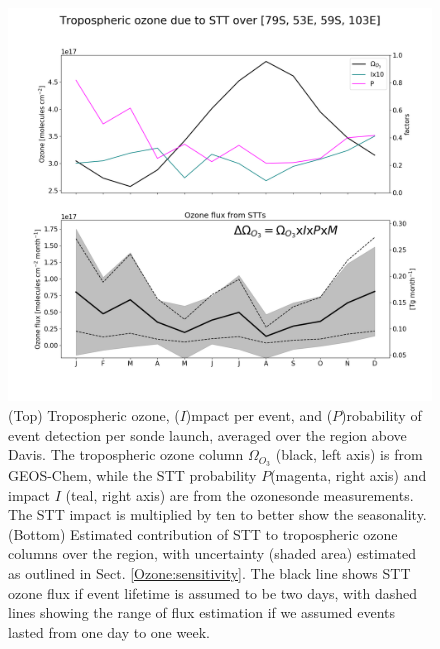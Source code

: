     
    \begin{figure}
      \includegraphics[width=12.0cm]{Figures/Ozone/STT_extrapolation_Dav.png}
      \caption{%
        (Top) Tropospheric ozone, ($I$)mpact per event, and ($P$)robability of event detection per sonde launch, averaged over the region above Davis.
        The tropospheric ozone column $\Omega_{O_3}$ (black, left axis) is from GEOS-Chem, while the STT probability  $P$(magenta, right axis) and impact $I$ (teal, right axis) are from the ozonesonde measurements.
        The STT impact is multiplied by ten to better show the seasonality.
        (Bottom) Estimated contribution of STT to tropospheric ozone columns over the region, with uncertainty (shaded area) estimated as outlined in Sect. \ref{Ozone:sensitivity}.
        The black line shows STT ozone flux if event lifetime is assumed to be two days, with dashed lines showing the range of flux estimation if we assumed events lasted from one day to one week.}
      \label{Ozone:fig:DavExtrapolation}
    \end{figure}
    

